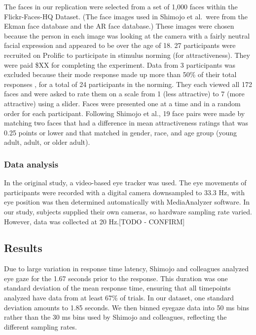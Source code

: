 \documentclass[
  man,floatsintext]{apa6}
\begin{document}
The faces in our replication were selected from a set of 1,000 faces
within the Flickr-Faces-HQ Dataset. (The face images used in Shimojo et
al.~were from the Ekman face database and the AR face database.) These
images were chosen because the person in each image was looking at the
camera with a fairly neutral facial expression and appeared to be over
the age of 18. 27 participants were recruited on Prolific to participate
in stimulus norming (for attractiveness). They were paid \$XX for
completing the experiment. Data from 3 participants was excluded because
their mode response made up more than 50\% of their total responses
, for a total of 24 participants
in the norming. They each viewed all 172 faces and were asked to rate
them on a scale from 1 (less attractive) to 7 (more attractive) using a
slider. Faces were presented one at a time and in a random order for
each participant. Following Shimojo et al., 19 face pairs were made by
matching two faces that had a difference in mean attractiveness ratings
that was 0.25 points or lower and that matched in gender, race, and age
group (young adult, adult, or older adult).

\hypertarget{data-analysis-2}{%
\subsubsection{Data analysis}\label{data-analysis-2}}

In the original study, a video-based eye tracker was used. The eye
movements of participants were recorded with a digital camera
downsampled to 33.3 Hz, with eye position was then determined
automatically with MediaAnalyzer software. In our study, subjects
supplied their own cameras, so hardware sampling rate varied. However,
data was collected at 20 Hz.{[}TODO - CONFIRM{]}

\hypertarget{results-4}{%
\subsection{Results}\label{results-4}}

Due to large variation in response time latency, Shimojo and colleagues analyzed eye gaze for the 1.67 seconds prior to the response. This duration was one standard deviation of the mean response time, ensuring that all timepoints analyzed have data from at least 67\% of trials. In our dataset, one standard deviation amounts to 1.85 seconds. We then binned eyegaze data into 50 ms bins rather than the 30 ms bins used by Shimojo and colleagues, reflecting the different sampling rates.
\end{document}
